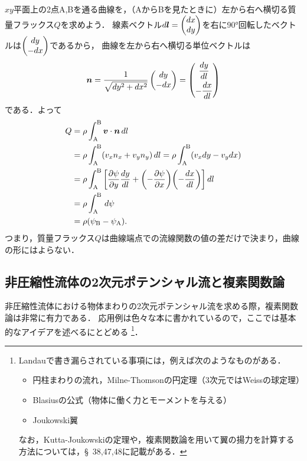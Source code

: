 $xy$平面上の2点A,Bを通る曲線を，（AからBを見たときに）左から右へ横切る質量フラックス$Q$を求めよう．
線素ベクトル$\dl = \pmqty{dx \\ dy}$を右に\ang{90}回転したベクトルは$\pmqty{dy \\ -dx}$であるから，
曲線を左から右へ横切る単位ベクトルは
\[
    \vec{n} = \frac{1}{\sqrt{dy^2+dx^2}} \pmqty{dy \\ -dx} = \pmqty{ \ddv{y}{l} \\[7pt] -\ddv{x}{l} } 
\]
である．よって
\begin{align}
    Q &= \rho \int_\textrm{A}^\textrm{B} \v \cdot \vec{n}  \, dl \notag \\
    &= \rho \int_\textrm{A}^\textrm{B} (v_x n_x + v_y n_y) \, dl = \rho \int_\textrm{A}^\textrm{B} (v_x dy - v_y dx) \notag \\
    &= \rho \int_\textrm{A}^\textrm{B} \bqty{ \pdv{\psi}{y}\dv{y}{l} + \pqty{-\pdv{\psi}{x}}\pqty{-\dv{x}{l}} } \, dl \notag \\
    &= \rho \int_\textrm{A}^\textrm{B} \, d\psi \notag \\
    &= \rho(\psi_\textrm{B}-\psi_\textrm{A}). \label{eq10.11:質量フラックスと流線関数の関係}
\end{align}
つまり，質量フラックス$Q$は曲線端点での流線関数の値の差だけで決まり，曲線の形にはよらない．



\subsection*{非圧縮性流体の2次元ポテンシャル流と複素関数論}
非圧縮性流体における物体まわりの2次元ポテンシャル流を求める際，複素関数論は非常に有力である．
応用例は色々な本に書かれているので，ここでは基本的なアイデアを述べるにとどめる
\footnote{
Landauで書き漏らされている事項には，例えば次のようなものがある．
\begin{itemize}
    \item 円柱まわりの流れ，Milne-Thomsonの円定理（3次元ではWeissの球定理）
    \item Blasiusの公式（物体に働く力とモーメントを与える）
    \item Joukowski翼
\end{itemize}
なお，Kutta-Joukowskiの定理や，複素関数論を用いて翼の揚力を計算する方法については，\S~38,47,48に記載がある．}．



